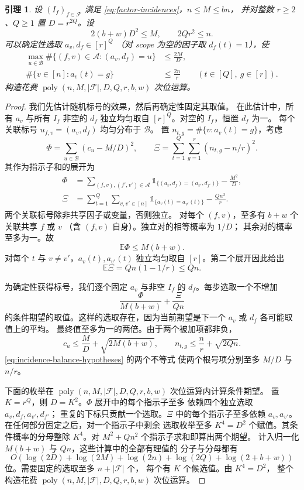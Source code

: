 \documentclass[11pt,reqno]{amsart}
\numberwithin{equation}{section}
\newtheorem{lemma}[theorem]{引理}
\theoremstyle{definition}\newtheorem{definition}[theorem]{定义}
\theoremstyle{remark}\newtheorem{remark}[theorem]{注}
\newcommand{\poly}{\operatorname{poly}}
\renewcommand{\le}{\leqslant}
\renewcommand{\ge}{\geqslant}
\begin{document}
\begin{lemma}\label{lem:incidence-labels}
设 $(I_f)_{f\in\mathcal F}$ 满足
\eqref{eq:factor-incidences}，$n\le M\le bn$，
并对整数 $r\ge2$、$Q\ge1$ 置 $D=r^{2Q}$。设
\begin{equation}\label{eq:incidence-balance-hypotheses}
 2(b+w)D^2\le M,\qquad 2Qr^2\le n.
\end{equation}
可以确定性选取 $a_v,d_f\in[r]^Q$
（对 scope 为空的因子取 $d_f(t)=1$），使
\[
 \begin{aligned}
 \max_{u\in\mathcal B}\#\{(f,v)\in\mathcal A:(a_v,d_f)=u\}
 &\le\frac{2M}{D},\\
 \#\{v\in[n]:a_v(t)=g\}&\le\frac{2n}{r}
 \qquad(t\in[Q],\ g\in[r]).
 \end{aligned}
\]
构造花费 $\poly(n,M,|\mathcal F|,D,Q,r,b,w)$ 次位运算。
\end{lemma}
\begin{proof}
我们先估计随机标号的效果，然后再确定性固定其取值。
在此估计中，所有 $a_v$ 与所有 $I_f$ 非空的 $d_f$
独立均匀取自 $[r]^Q$。对空的 $I_f$，恒置 $d_f$ 为一。
每个关联标号 $u_{f,v}=(a_v,d_f)$ 均匀分布于 $\mathcal B$。
置 $n_{t,g}=\#\{v:a_v(t)=g\}$，考虑
\[
 \Phi=\sum_{u\in\mathcal B}(c_u-M/D)^2,
 \qquad
 \Xi=\sum_{t=1}^Q\sum_{g=1}^r(n_{t,g}-n/r)^2.
\]
其作为指示子和的展开为
\[
 \begin{aligned}
 \Phi&=\sum_{(f,v),(f',v')\in\mathcal A}
       \mathds{1}_{\{(a_v,d_f)=(a_{v'},d_{f'})\}}-\frac{M^2}{D},\\
 \Xi&=\sum_{t=1}^Q\sum_{v,v'\in[n]}
       \mathds{1}_{\{a_v(t)=a_{v'}(t)\}}-\frac{Qn^2}{r}.
 \end{aligned}
\]
两个关联标号除非共享因子或变量，否则独立。
对每个 $(f,v)$，至多有 $b+w$ 个关联共享 $f$ 或 $v$
（含 $(f,v)$ 自身）。独立对的相等概率为 $1/D$；
其余对的概率至多为一。故
\[
 \mathbb E\Phi\le M(b+w).
\]
对每个 $t$ 与 $v\ne v'$，$a_v(t),a_{v'}(t)$
独立均匀取自 $[r]$。第二个展开因此给出
\[
 \mathbb E\Xi=Qn(1-1/r)\le Qn.
\]

为确定性获得标号，我们逐个固定 $a_v$ 与非空 $I_f$
的 $d_f$。每步选取一个不增加
\[
 \frac{\Phi}{M(b+w)}+\frac{\Xi}{Qn}
\]
的条件期望的取值。这样的选取存在，因为当前期望是下一个
$a_v$ 或 $d_f$ 各可能取值上的平均。
最终值至多为一的两倍。由于两个被加项都非负，
\[
 c_u\le\frac MD+\sqrt{2M(b+w)},\qquad
 n_{t,g}\le\frac nr+\sqrt{2Qn}.
\]
\eqref{eq:incidence-balance-hypotheses} 的两个不等式
使两个根号项分别至多 $M/D$ 与 $n/r$。

下面的枚举在 $\poly(n,M,|\mathcal F|,D,Q,r,b,w)$
次位运算内计算条件期望。
置 $K=r^Q$，则 $D=K^2$。$\Phi$ 展开中的每个指示子至多
依赖四个独立选取 $a_v,d_f,a_{v'},d_{f'}$；
重复的下标只贡献一个选取。$\Xi$ 中的每个指示子至多依赖
$a_v,a_{v'}$。在任何部分固定之后，对一个指示子中剩余
选取枚举至多 $K^4=D^2$ 个赋值。其条件概率的分母整除
$K^4$。对 $M^2+Qn^2$ 个指示子求和即算出两个期望。
计入归一化 $M(b+w)$ 与 $Qn$，这些计算中的全部有理值的
分子与分母都有
\[
 O\!\left(\log(2D)+\log(2M)+\log(2n)+\log(2Q)+\log(2+b+w)\right)
\]
位。需要固定的选取至多 $n+|\mathcal F|$ 个，
每个有 $K$ 个候选值。由 $K^4=D^2$，
整个构造花费 $\poly(n,M,|\mathcal F|,D,Q,r,b,w)$
次位运算。
\end{proof}
\end{document}
